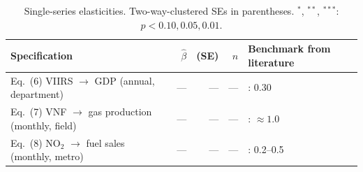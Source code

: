 \begin{table}[H]
\centering
\caption{Single-series elasticities. Two-way-clustered SEs in parentheses.
$^{*}$, $^{**}$, $^{***}$: $p<0.10,0.05,0.01$.}
\label{tab:elasticities}
\small
\begin{tabular}{lrrrl}
\toprule
Specification & $\hat\beta$ & (SE) & $n$ & Benchmark from literature \\
\midrule
Eq.~(6) VIIRS $\to$ GDP (annual, department) & --- & --- & --- & \citet{hsw2012}: 0.30 \\
Eq.~(7) VNF $\to$ gas production (monthly, field) & --- & --- & --- & \citet{do_etal2018}: $\approx 1.0$ \\
Eq.~(8) NO$_2$ $\to$ fuel sales (monthly, metro) & --- & --- & --- & \citet{bauwens2020}: 0.2--0.5 \\
\bottomrule
\end{tabular}
\end{table}

